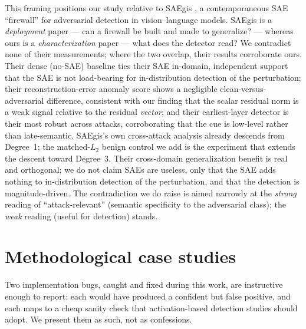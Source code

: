 \documentclass[../ppgc-tese.tex]{subfiles}
\begin{document}
This framing positions our study relative to SAEgis \cite{wang2026saegis}, a
contemporaneous SAE ``firewall'' for adversarial detection in vision--language
models. SAEgis is a \emph{deployment} paper --- can a firewall be built and made to
generalize? --- whereas ours is a \emph{characterization} paper --- what does the
detector read? We contradict none of their measurements; where the two overlap, their
results corroborate ours. Their dense (no-SAE) baseline ties their SAE in-domain,
independent support that the SAE is not load-bearing for in-distribution detection of
the perturbation; their reconstruction-error anomaly score shows a negligible
clean-versus-adversarial difference, consistent with our finding that the scalar
residual norm is a weak signal relative to the residual \emph{vector}; and their
earliest-layer detector is their most robust across attacks, corroborating that the
cue is low-level rather than late-semantic. SAEgis's own cross-attack analysis
already descends from Degree~1; the matched-$L_2$ benign control we add is the
experiment that extends the descent toward Degree~3. Their cross-domain
generalization benefit is real and orthogonal; we do not claim SAEs are useless, only
that the SAE adds nothing to in-distribution detection of the perturbation, and that
the detection is magnitude-driven. The contradiction we do raise is aimed narrowly at
the \emph{strong} reading of ``attack-relevant'' (semantic specificity to the
adversarial class); the \emph{weak} reading (useful for detection) stands.

\section{Methodological case studies}
\label{sec:adv-bugs}
Two implementation bugs, caught and fixed during this work, are instructive enough to
report: each would have produced a confident but false positive, and each maps to a
cheap sanity check that activation-based detection studies should adopt. We present
them as such, not as confessions.
\end{document}
